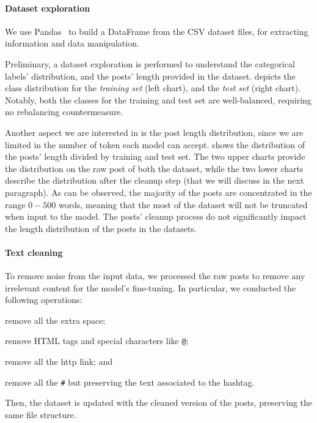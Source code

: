 \documentclass[11pt]{article}
\begin{document}
\paragraph{Dataset exploration}
We use Pandas~\cite{reback2020pandas} to build a DataFrame from the CSV dataset files,
for extracting information and data manipulation.

Preliminary,
a dataset exploration is performed to understand the categorical labels' distribution,
and the posts' length provided in the dataset.
%
 depicts the class distribution for the \emph{training set} (left chart),
and the \emph{test set} (right chart).
%
Notably,
both the classes for the training and test set are well-balanced,
requiring no rebalancing countermeasure.

Another aspect we are interested in is the post length distribution,
since we are limited in the number of token each model can accept.
%
 shows the distribution of the posts' length divided by training and test set.
%
The two upper charts provide the distribution on the raw post of both the dataset,
while the two lower charts describe the distribution after the cleanup step (that we will discuss in the next paragraph).
%
As can be observed,
the majority of the posts are concentrated in the range $0-500$ words,
meaning that the most of the dataset will not be truncated when input to the model.
%
The posts' cleanup process do not significantly impact the length distribution of the posts in the datasets.

\paragraph{Text cleaning}
To remove noise from the input data,
we processed the raw posts to remove any irrelevant content for the model's fine-tuning.
%
In particular,
we conducted the following operations:
\begin{enumerate*}[label=(\roman{*})]
  \item remove all the extra space;
  \item remove HTML tags and special characters like \texttt{@};
  \item remove all the http link; and
  \item remove all the \texttt{\#} but preserving the text associated to the hashtag.
\end{enumerate*}
Then,
the dataset is updated with the cleaned version of the posts,
preserving the same file structure.
\end{document}
